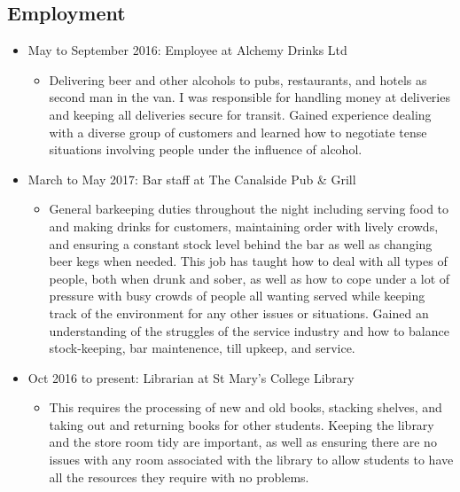 \documentclass[10pt, a4paper]{article}
\begin{document}
	\subsection{Employment}
	\begin{itemize}
		\item May to September 2016: Employee at Alchemy Drinks Ltd
		\begin{itemize}
			\item Delivering beer and other alcohols to pubs, restaurants, and hotels as second man in the van. I was responsible for handling money at deliveries and keeping all deliveries secure for transit. Gained experience dealing with a diverse group of customers and learned how to negotiate tense situations involving people under the influence of alcohol.
		\end{itemize}
		\item March to May 2017: Bar staff at The Canalside Pub \& Grill
		\begin{itemize}
			\item General barkeeping duties throughout the night including serving food to and making drinks for customers, maintaining order with lively crowds, and ensuring a constant stock level behind the bar as well as changing beer kegs when needed. This job has taught how to deal with all types of people, both when drunk and sober, as well as how to cope under a lot of pressure with busy crowds of people all wanting served while keeping track of the environment for any other issues or situations. Gained an understanding of the struggles of the service industry and how to balance stock-keeping, bar maintenence, till upkeep, and service.
		\end{itemize}
		\item Oct 2016 to present: Librarian at St Mary's College Library
		\begin{itemize}
			\item This requires the processing of new and old books, stacking shelves, and taking out and returning books for other students. Keeping the library and the store room tidy are important, as well as ensuring there are no issues with any room associated with the library to allow students to have all the resources they require with no problems.
		\end{itemize}
	\end{itemize}
\end{document}
